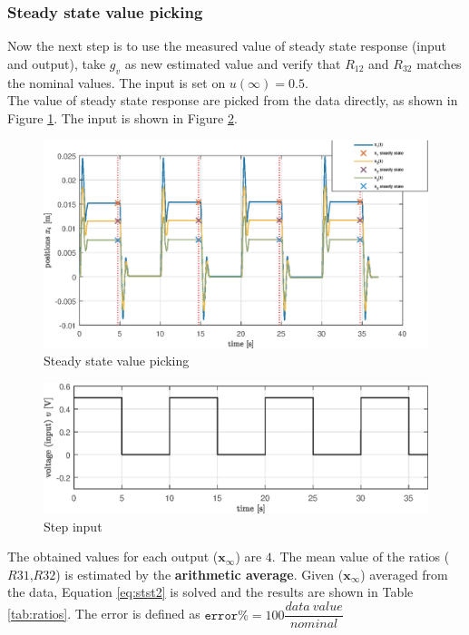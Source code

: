 \documentclass[twosided,a4paper]{article}           %
\begin{document}
\subsubsection{Steady state value picking}
Now the next step is to use the measured value of steady state response (input and output), take $g_v$ as new estimated value and verify that $R_{12}$ and $R_{32}$ matches the nominal values. The input is set on $u(\infty) = 0.5$.\\
The value of steady state response are picked from the data directly, as shown in Figure \ref{fig:stst1}. The input is shown in Figure \ref{fig:step_input}.
\begin{figure}[H]
	\centering
	\includegraphics[width=\linewidth]{img/stst1}
	\caption[steady state value picking]{Steady state value picking}
	\label{fig:stst1}
\end{figure}
\begin{figure}[H]
	\centering
	\includegraphics[width=\linewidth]{img/step_input}
	\caption{Step input}
	\label{fig:step_input}
\end{figure}
\noindent
The obtained values for each output ($\bm x_{\infty}$) are $4$. The mean value of the ratios ($R31$,$R32$) is estimated by the \textbf{arithmetic average}. Given ($ \bm x_{\infty}$) averaged from the data, Equation \eqref{eq:stst2} is solved and the results are shown in Table \ref{tab:ratios}. The error is defined as $\texttt{error}\% = 100\dfrac{data \ value}{nominal}$
\end{document}

